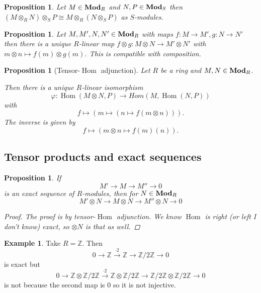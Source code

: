 \documentclass{article}
\newcommand{\Z}{\mathbb{Z}}
\DeclareMathOperator{\Hom}{Hom}
\DeclareMathOperator{\modules}{{\bf Mod}}
\newtheorem{proposition}[theorem]{Proposition}
\theoremstyle{definition}
\newtheorem{example}[theorem]{Example}
\begin{document}
\begin{proposition}
    Let \(M\in\modules_{R}\) and \(N,P\in\modules_{S}\) then
    \((M\otimes_{R}N)\otimes_{S}P\cong M\otimes_{R}(N\otimes_{S}P)\) as
    \(S\)-modules.
\end{proposition}

\begin{proposition}
    Let \(M,M',N,N'\in\modules_{R}\) with maps \(f:M\to M',g:N\to N'\) then
    there is a unique \(R\)-linear map \(f\otimes g:M\otimes N\to M'\otimes N'\)
    with \(m\otimes n\mapsto f(m)\otimes g(m)\). This is compatible with
    composition.
\end{proposition}

\begin{proposition}[Tensor-\(\Hom\) adjunction]
    Let \(R\) be a ring and \(M,N\in\modules_{R}\).

    Then there is a unique \(R\)-linear isomorphism
    \[
        \varphi:\Hom(M\otimes N, P)\to Hom(M,\Hom(N,P))
    \]
    with
    \[
        f\mapsto(m\mapsto(n\mapsto f(m\otimes n))).
    \]
    The inverse is given by
    \[
        f\mapsto (m\otimes n\mapsto f(m)(n)).
    \]
\end{proposition}

\subsection{Tensor products and exact sequences}
\begin{proposition}
    If
    \[
        M'\to M\to M''\to 0
    \]
    is an exact sequence of \(R\)-modules, then for \(N\in\modules_{R}\)
    \[
        M'\otimes N\to M\otimes N\to M''\otimes N\to 0
    \]

    \begin{proof}
        The proof is by tensor-\(\Hom\) adjunction. We know \(\Hom\) is right
        (or left I don't know) exact, so \(\otimes N\) is that as well.
    \end{proof}
\end{proposition}

\begin{example}
    Take \(R=\Z\). Then
    \[
        0\to \Z\overset{\cdot 2}{\to} \Z\to \Z/2\Z\to 0
    \]
    is exact but
    \[
        0\to \Z\otimes\Z/2\Z\overset{\cdot2}{\to}\Z\otimes \Z/2\Z\to \Z/2\Z\otimes\Z/2\Z\to 0
    \]
    is not because the second map is \(0\) so it is not injective.
\end{example}
\end{document}
